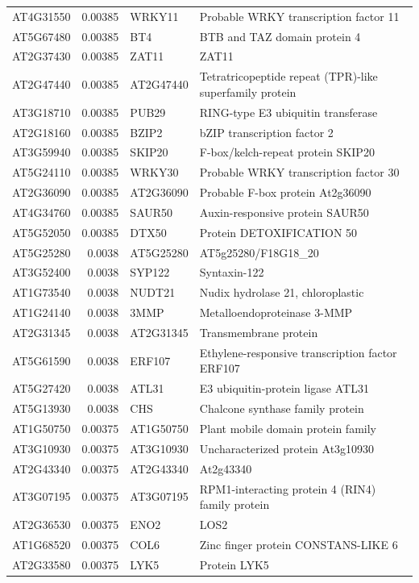 \documentclass[11pt]{article}
\begin{document}
\begin{center}
\begin{tabular}{lrll}
AT4G31550 & 0.00385 & WRKY11 & Probable WRKY transcription factor 11\\
AT5G67480 & 0.00385 & BT4 & BTB and TAZ domain protein 4\\
AT2G37430 & 0.00385 & ZAT11 & ZAT11\\
AT2G47440 & 0.00385 & AT2G47440 & Tetratricopeptide repeat (TPR)-like superfamily protein\\
AT3G18710 & 0.00385 & PUB29 & RING-type E3 ubiquitin transferase\\
AT2G18160 & 0.00385 & BZIP2 & bZIP transcription factor 2\\
AT3G59940 & 0.00385 & SKIP20 & F-box/kelch-repeat protein SKIP20\\
AT5G24110 & 0.00385 & WRKY30 & Probable WRKY transcription factor 30\\
AT2G36090 & 0.00385 & AT2G36090 & Probable F-box protein At2g36090\\
AT4G34760 & 0.00385 & SAUR50 & Auxin-responsive protein SAUR50\\
AT5G52050 & 0.00385 & DTX50 & Protein DETOXIFICATION 50\\
AT5G25280 & 0.0038 & AT5G25280 & AT5g25280/F18G18\_20\\
AT3G52400 & 0.0038 & SYP122 & Syntaxin-122\\
AT1G73540 & 0.0038 & NUDT21 & Nudix hydrolase 21, chloroplastic\\
AT1G24140 & 0.0038 & 3MMP & Metalloendoproteinase 3-MMP\\
AT2G31345 & 0.0038 & AT2G31345 & Transmembrane protein\\
AT5G61590 & 0.0038 & ERF107 & Ethylene-responsive transcription factor ERF107\\
AT5G27420 & 0.0038 & ATL31 & E3 ubiquitin-protein ligase ATL31\\
AT5G13930 & 0.0038 & CHS & Chalcone synthase family protein\\
AT1G50750 & 0.00375 & AT1G50750 & Plant mobile domain protein family\\
AT3G10930 & 0.00375 & AT3G10930 & Uncharacterized protein At3g10930\\
AT2G43340 & 0.00375 & AT2G43340 & At2g43340\\
AT3G07195 & 0.00375 & AT3G07195 & RPM1-interacting protein 4 (RIN4) family protein\\
AT2G36530 & 0.00375 & ENO2 & LOS2\\
AT1G68520 & 0.00375 & COL6 & Zinc finger protein CONSTANS-LIKE 6\\
AT2G33580 & 0.00375 & LYK5 & Protein LYK5\\

\end{tabular}
\end{center}
\end{document}
